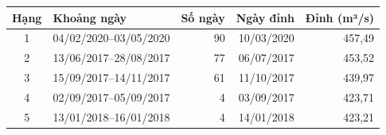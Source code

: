\begin{tabular}{clrrr}
\toprule
Hạng & Khoảng ngày & Số ngày & Ngày đỉnh & Đỉnh (m³/s) \\
\midrule
1 & 04/02/2020–03/05/2020 & 90 & 10/03/2020 & 457{,}49 \\
2 & 13/06/2017–28/08/2017 & 77 & 06/07/2017 & 453{,}52 \\
3 & 15/09/2017–14/11/2017 & 61 & 11/10/2017 & 439{,}97 \\
4 & 02/09/2017–05/09/2017 & 4 & 03/09/2017 & 423{,}71 \\
5 & 13/01/2018–16/01/2018 & 4 & 14/01/2018 & 423{,}21 \\
\bottomrule
\end{tabular}
